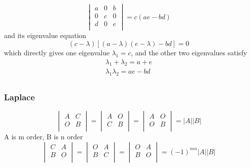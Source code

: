 \documentclass{overview}
\begin{document}
\[
\begin{vmatrix}
	a & 0 & b \\
	0 & c & 0 \\
	d & 0 & e \\
\end{vmatrix}=c(ae - bd)
\] 
and its eigenvalue equation
\[
	(c-\lambda)[(a-\lambda)(e-\lambda)-bd]=0
\]
which directly gives one eigenvalue $\lambda_1=c$, and the other two eigenvalues
satisfy
\[
	\begin{aligned}
		\lambda_1+\lambda_2 = a+e \\
		\lambda_1\lambda_2 = ae - bd \\
	\end{aligned}	
\] 

\subsubsection{Laplace}

\[
\begin{vmatrix}
	A & C \\
	O & B \\
\end{vmatrix}
=\begin{vmatrix}
	A & O \\
	C & B \\
\end{vmatrix}
=\begin{vmatrix}
	A & O \\
	O & B \\
\end{vmatrix}
=|A||B|
\] 
A is m order, B is n order
\[
\begin{vmatrix}
	C & A \\
	B & O \\
\end{vmatrix}
=\begin{vmatrix}
	O & A \\
	B & C \\
\end{vmatrix}
=\begin{vmatrix}
	O & A \\
	B & O \\
\end{vmatrix}
=(-1)^{mn}|A||B|
\] 
\end{document}
